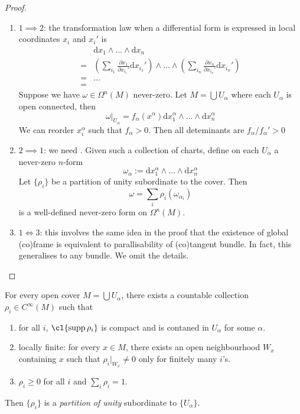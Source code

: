 \documentclass[a4paper]{article}
\newcommand{\w}{\wedge}
\begin{document}
\begin{proof}\leavevmode
  \begin{enumerate}
  \item \(1 \implies 2\): the transformation law when a differential form is expressed in local coordinates \(x_i\) and \(x_i'\) is
    \begin{align*}
      &\mathrm dx_1 \w \dots \w \mathrm dx_n \\
      =& \left( \sum_{i_1} \frac{\partial x_1}{\partial x_{i_1}'} \mathrm dx_{i_1}' \right) \w \dots \w \left( \sum_{i_n} \frac{\partial x_n}{\partial x_{i_n}'} \mathrm dx_{i_n}' \right) \\
      =& \dots \\
      =& 
    \end{align*}
    Suppose we have \(\omega \in \Omega^n(M)\) never-zero. Let \(M = \bigcup U_\alpha\) where each \(U_\alpha\) is open connected, then
    \[
      \omega|_{U_\alpha} = f_\alpha(x^\alpha) \mathrm d x_1^\alpha \w \dots \w \mathrm dx_n^\alpha
    \]
    We can reorder \(x_i^\alpha\) such that \(f_\alpha > 0\). Then all deteminants are \(f_\alpha/f_\alpha' > 0\)
  \item \(2 \implies 1\): we need . Given such a collection of charts, define on each \(U_\alpha\) a never-zero \(n\)-form
    \[
      \omega_\alpha := \mathrm d x_1^\alpha \w \dots \w \mathrm dx_n^\alpha
    \]
    Let \(\{\rho_i\}\) be a partition of unity subordinate to the cover. Then
    \[
      \omega = \sum_i \rho_i (\omega_{\alpha_i})
    \]
    is a well-defined never-zero form on \(\Omega^n(M)\).
  \item \(1 \Longleftrightarrow 3\): this involves the same idea in the proof that the existence of global (co)frame is equivalent to parallisability of (co)tangent bundle. In fact, this generalises to any bundle. We omit the details.
  \end{enumerate}
\end{proof}

\begin{theorem}
  \label{thm:partition of unity}
  For every open cover \(M = \bigcup U_\alpha\), there exists a countable collection \(\rho_i \in C^\infty(M)\) such that
  \begin{enumerate}
  \item for all \(i\), \(\cl{\operatorname{supp}{\rho_i}}\) is compact and is contaned in \(U_\alpha\) for some \(\alpha\).
  \item locally finite: for every \(x \in M\), there exists an open neighbourhood \(W_x\) containing \(x\) such that \(\rho_i|_{W_x} \neq 0\) only for finitely many \(i\)'s.
  \item \(\rho_i \geq 0\) for all \(i\) and \(\sum_i \rho_i = 1\).
  \end{enumerate}
  Then \(\{\rho_i\}\) is a \emph{partition of unity} subordinate to \(\{U_\alpha\}\).
\end{theorem}
\end{document}
